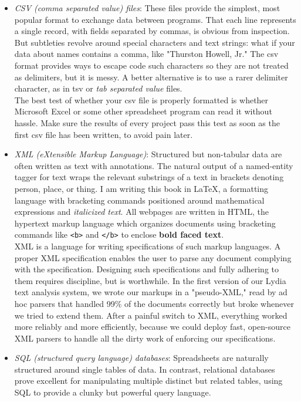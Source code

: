 \documentclass[10pt]{article}
\begin{document}
\begin{itemize}
  \item \textit{CSV (comma separated value) files}: These files provide the simplest, most popular format to exchange data between programs. That each line represents a single record, with fields separated by commas, is obvious from inspection. But subtleties revolve around special characters and text strings: what if your data about names contains a comma, like "Thurston Howell, Jr." The csv format provides ways to escape code such characters so they are not treated as delimiters, but it is messy. A better alternative is to use a rarer delimiter character, as in tsv or \textit{tab separated value} files.\\
The best test of whether your csv file is properly formatted is whether Microsoft Excel or some other spreadsheet program can read it without hassle. Make sure the results of every project pass this test as soon as the first csv file has been written, to avoid pain later.
  \item \textit{XML (eXtensible Markup Language)}: Structured but non-tabular data are often written as text with annotations. The natural output of a named-entity tagger for text wraps the relevant substrings of a text in brackets denoting person, place, or thing. I am writing this book in LaTeX, a formatting language with bracketing commands positioned around mathematical expressions and \textit{italicized text}. All webpages are written in HTML, the hypertext markup language which organizes documents using bracketing commands like \texttt{<b>} and \texttt{</b>} to enclose \textbf{bold faced text}.\\
XML is a language for writing specifications of such markup languages. A proper XML specification enables the user to parse any document complying with the specification. Designing such specifications and fully adhering to them requires discipline, but is worthwhile. In the first version of our Lydia text analysis system, we wrote our markups in a "pseudo-XML," read by ad hoc parsers that handled 99\% of the documents correctly but broke whenever we tried to extend them. After a painful switch to XML, everything worked more reliably and more efficiently, because we could deploy fast, open-source XML parsers to handle all the dirty work of enforcing our specifications.
  \item \textit{SQL (structured query language) databases}: Spreadsheets are naturally structured around single tables of data. In contrast, relational databases prove excellent for manipulating multiple distinct but related tables, using SQL to provide a clunky but powerful query language.\\

\end{itemize}
\end{document}
